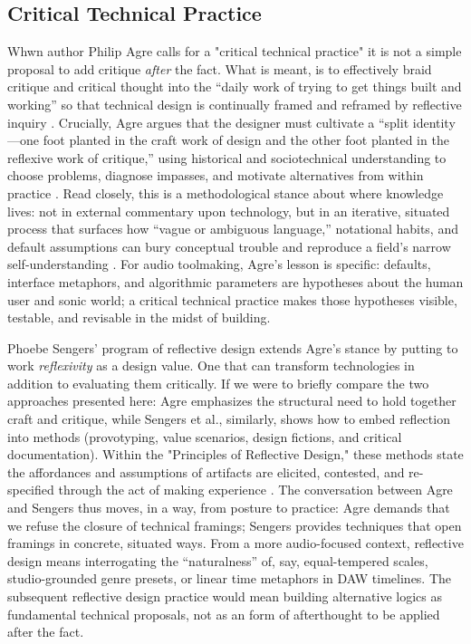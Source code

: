 \subsection{Critical Technical Practice}
Whwn author Philip Agre calls for a "critical technical practice" it is not a simple proposal to add critique \emph{after} the fact. What is meant, is to effectively braid critique and critical thought into the “daily work of trying to get things built and working” so that technical design is continually framed and reframed by reflective inquiry \parencite[p.~155]{Agre_1998}. Crucially, Agre argues that the designer must cultivate a “split identity—one foot planted in the craft work of design and the other foot planted in the reflexive work of critique,” using historical and sociotechnical understanding to choose problems, diagnose impasses, and motivate alternatives from within practice \parencite[p.~155]{Agre_1998}. Read closely, this is a methodological stance about where knowledge lives: not in external commentary upon technology, but in an iterative, situated process that surfaces how “vague or ambiguous language,” notational habits, and default assumptions can bury conceptual trouble and reproduce a field’s narrow self-understanding \parencite[p.~155]{Agre_1998}. For audio toolmaking, Agre’s lesson is specific: defaults, interface metaphors, and algorithmic parameters are hypotheses about the human user and sonic world; a critical technical practice makes those hypotheses visible, testable, and revisable in the midst of building.

Phoebe Sengers’ program of reflective design extends Agre’s stance by putting to work \emph{reflexivity} as a design value. One that can transform technologies in addition to evaluating them critically. If we were to briefly compare the two approaches presented here: Agre emphasizes the structural need to hold together craft and critique, while Sengers et al., similarly, shows how to embed reflection into methods (provotyping, value scenarios, design fictions, and critical documentation). Within the "Principles of Reflective Design," these methods state the affordances and assumptions of artifacts are elicited, contested, and re-specified through the act of making experience \parencite[~55]{Sengers_2005}. The conversation between Agre and Sengers thus moves, in a way, from posture to practice: Agre demands that we refuse the closure of technical framings; Sengers provides techniques that open framings in concrete, situated ways. From a more audio-focused context, reflective design means interrogating the “naturalness” of, say, equal-tempered scales, studio-grounded genre presets, or linear time metaphors in DAW timelines. The subsequent reflective design practice would mean building alternative logics as fundamental technical proposals, not as an form of afterthought to be applied after the fact.


